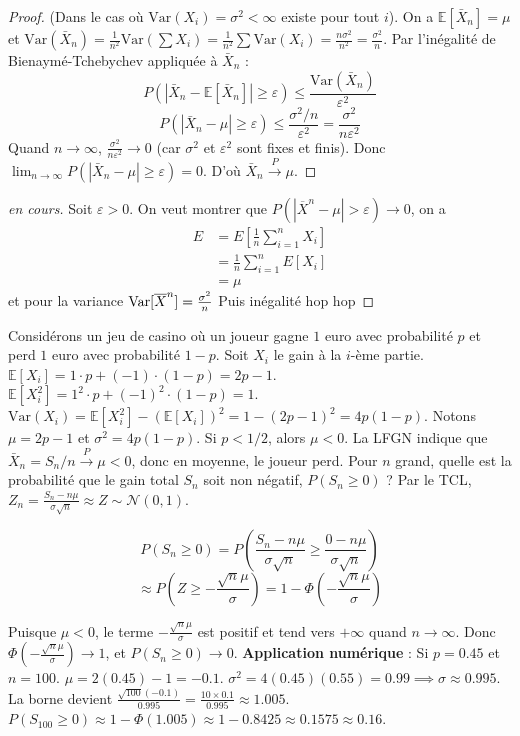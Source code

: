 \begin{proof}
(Dans le cas où $\text{Var}(X_i) = \sigma^2 < \infty$ existe pour tout $i$). On a $\mathbb{E}[\bar{X}_n] = \mu$ et $\text{Var}(\bar{X}_n) = \frac{1}{n^2} \text{Var}(\sum X_i) = \frac{1}{n^2} \sum \text{Var}(X_i) = \frac{n\sigma^2}{n^2} = \frac{\sigma^2}{n}$. Par l'inégalité de Bienaymé-Tchebychev appliquée à $\bar{X}_n$ :
$$P(|\bar{X}_n - \mathbb{E}[\bar{X}_n]| \ge \varepsilon) \le \frac{\text{Var}(\bar{X}_n)}{\varepsilon^2}$$
$$P(|\bar{X}_n - \mu| \ge \varepsilon) \le \frac{\sigma^2/n}{\varepsilon^2} = \frac{\sigma^2}{n\varepsilon^2}$$
Quand $n \to \infty$, $\frac{\sigma^2}{n\varepsilon^2} \to 0$ (car $\sigma^2$ et $\varepsilon^2$ sont fixes et finis). Donc $\lim_{n \to \infty} P(|\bar{X}_n - \mu| \ge \varepsilon) = 0$. D'où $\bar{X}_n \xrightarrow{P} \mu$.
\end{proof}

\begin{proof}[en cours]
    Soit $\varepsilon>0$. On veut montrer que $P(|\overline{X}^n-\mu|> \varepsilon)\to 0$, on a 
    \begin{align*}
        E&=E[\frac{1}{n}\sum_{i=1}^n X_i]\\
        &=\frac{1}{n}\sum_{i=1}^n E[X_i]\\
        &= \mu
    \end{align*}
    et pour la variance $\operatorname{Var}[\overline{X}^n]= \frac{\sigma^2}{n}$ Puis inégalité hop hop
\end{proof}

\vspace{1em}

\begin{exemple}
Considérons un jeu de casino où un joueur gagne $1$ euro avec probabilité $p$ et perd $1$ euro avec probabilité $1-p$. Soit $X_i$ le gain à la $i$-ème partie.
$\mathbb{E}[X_i] = 1 \cdot p + (-1) \cdot (1-p) = 2p-1$. $\mathbb{E}[X_i^2] = 1^2 \cdot p + (-1)^2 \cdot (1-p) = 1$. $\text{Var}(X_i) = \mathbb{E}[X_i^2] - (\mathbb{E}[X_i])^2 = 1 - (2p-1)^2 = 4p(1-p)$. Notons $\mu = 2p-1$ et $\sigma^2 = 4p(1-p)$. Si $p < 1/2$, alors $\mu < 0$. La LFGN indique que $\bar{X}_n = S_n/n \xrightarrow{P} \mu < 0$, donc en moyenne, le joueur perd. Pour $n$ grand, quelle est la probabilité que le gain total $S_n$ soit non négatif, $P(S_n \ge 0)$ ? Par le TCL, $Z_n = \frac{S_n-n\mu}{\sigma\sqrt{n}} \approx Z \sim \mathcal{N}(0,1)$.

$$P(S_n \ge 0) = P\left( \frac{S_n - n\mu}{\sigma\sqrt{n}} \ge \frac{0 - n\mu}{\sigma\sqrt{n}} \right)$$
$$\approx P\left( Z \ge -\frac{\sqrt{n}\mu}{\sigma} \right) = 1 - \Phi\left( -\frac{\sqrt{n}\mu}{\sigma} \right)$$

Puisque $\mu < 0$, le terme $-\frac{\sqrt{n}\mu}{\sigma}$ est positif et tend vers $+\infty$ quand $n \to \infty$. Donc $\Phi\left( -\frac{\sqrt{n}\mu}{\sigma} \right) \to 1$, et $P(S_n \ge 0) \to 0$. \textbf{Application numérique} : Si $p = 0.45$ et $n = 100$. $\mu = 2(0.45)-1 = -0.1$. $\sigma^2 = 4(0.45)(0.55) = 0.99 \implies \sigma \approx 0.995$. La borne devient $\frac{\sqrt{100}(-0.1)}{0.995} = \frac{10 \times 0.1}{0.995} \approx 1.005$. $P(S_{100} \ge 0) \approx 1 - \Phi(1.005) \approx 1 - 0.8425 \approx 0.1575 \approx 0.16$.
\end{exemple}

